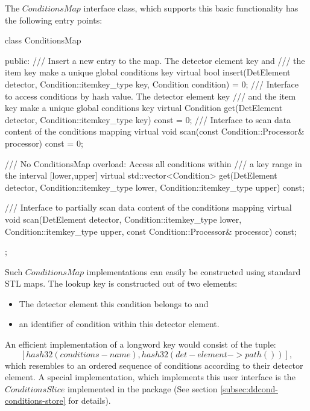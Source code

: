 \documentclass[10pt,a4paper]{article}
\begin{document}
\noindent
The $ConditionsMap$ interface class, which supports this basic functionality
has the following entry points:
\begin{unnumberedcode}
  class ConditionsMap   {
  public:
    /// Insert a new entry to the map. The detector element key and 
    /// the item key make a unique global conditions key
    virtual bool insert(DetElement         detector,
                        Condition::itemkey_type key,
                        Condition          condition) = 0;
    /// Interface to access conditions by hash value. The detector element key 
    /// and the item key make a unique global conditions key
    virtual Condition get(DetElement              detector,
                          Condition::itemkey_type key) const = 0;
    /// Interface to scan data content of the conditions mapping
    virtual void scan(const Condition::Processor& processor) const = 0;

    /// No ConditionsMap overload: Access all conditions within 
    /// a key range in the interval [lower,upper]
    virtual std::vector<Condition> get(DetElement              detector,
                                       Condition::itemkey_type lower,
                                       Condition::itemkey_type upper)  const;
      
    /// Interface to partially scan data content of the conditions mapping
    virtual void scan(DetElement                  detector,
                      Condition::itemkey_type     lower,
                      Condition::itemkey_type     upper,
                      const Condition::Processor& processor) const;
  };
\end{unnumberedcode}
Such $ConditionsMap$ implementations can easily be constructed using standard
STL maps. The lookup key is constructed out of two elements:
\begin{itemize}\itemcompact
\item The detector element this condition belongs to and 
\item an identifier of condition within this detector element.
\end{itemize}
An efficient implementation of a longword key would consist of the tuple:
$$
[ hash32(conditions-name) , hash32(det-element->path()) ],
$$
which resembles to an ordered sequence of conditions according to 
their detector element. A special implementation, which implements 
this user interface is the $ConditionsSlice$ implemented in the 
\DDC package (See section \ref{subsec:ddcond-conditions-store} for details).
\end{document}
